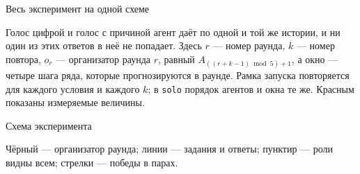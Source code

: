 \documentclass[aspectratio=169,11pt]{beamer}
\newcommand{\glyph}[4]{%
    \begin{scope}[shift={(#1,#2)}]
      \foreach \i in {1,...,5} \coordinate (p\i) at ({90-72*(\i-1)}:.55);
      \ifnum#4=2
        \foreach \i in {1,...,5}{\foreach \j in {1,...,5}{%
          \ifnum\i<\j\ifnum\i=#3\else\ifnum\j=#3\else
            \draw[gray,dotted,line width=.6pt] (p\i)--(p\j);
          \fi\fi\fi}}
      \fi
      \ifnum#4>0
        \foreach \i in {1,...,5}{\ifnum\i=#3\else \draw[line width=.6pt] (p#3)--(p\i);\fi}
      \fi
      \foreach \i in {1,...,5}{\ifnum\i=#3\node[ag1] at (p\i) {};\else\node[ag0] at (p\i) {};\fi}
    \end{scope}}
\newcommand{\vote}[2]{%
    \begin{scope}[shift={(#1,#2)}]
      \foreach \i in {1,...,5} \coordinate (q\i) at ({90-72*(\i-1)}:.72);
      \foreach \i in {1,...,5}{\foreach \j in {1,...,5}{\ifnum\i<\j
        \draw[-{Stealth[length=1.6mm]},acc,line width=.5pt,shorten >=1.5mm,shorten <=1.5mm] (q\i)--(q\j);\fi}}
      \foreach \i in {1,...,5} \node[ag0] at (q\i) {};
    \end{scope}}
\begin{document}
\begin{frame}{Весь эксперимент на одной схеме}
\vspace{1mm}
\raggedright\scriptsize Голос цифрой и голос с причиной агент даёт по одной и той же истории, и ни один из этих ответов в неё не попадает. Здесь $r$ --- номер раунда, $k$ --- номер повтора, $o_r$ --- организатор раунда $r$, равный $A_{((r+k-1)\bmod 5)+1}$, а окно --- четыре шага ряда, которые прогнозируются в раунде. Рамка запуска повторяется для каждого условия и каждого $k$; в \texttt{solo} порядок агентов и окна те же. Красным показаны измеряемые величины.
\end{frame}

\begin{frame}{Схема эксперимента}
\centering
{}

\vspace{1mm}
\scriptsize Чёрный --- организатор раунда; линии --- задания и ответы; пунктир --- роли видны всем; стрелки --- победы в парах.
\end{frame}
\end{document}
